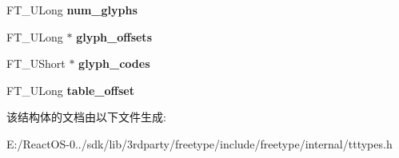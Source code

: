 \begin{DoxyCompactItemize}
F\+T\+\_\+\+U\+Long {\bfseries num\+\_\+glyphs}
\item 
\mbox{\label{struct_t_t___s_bit___range_rec___a475f649f101b5886cc2443934e6aa9ca}} 
F\+T\+\_\+\+U\+Long $\ast$ {\bfseries glyph\+\_\+offsets}
\item 
\mbox{\label{struct_t_t___s_bit___range_rec___ad40d4aa7e48bdb4ab8c98850f1bba178}} 
F\+T\+\_\+\+U\+Short $\ast$ {\bfseries glyph\+\_\+codes}
\item 
\mbox{\label{struct_t_t___s_bit___range_rec___a54457937305b5ccf895f5b23c0cc6006}} 
F\+T\+\_\+\+U\+Long {\bfseries table\+\_\+offset}
\end{DoxyCompactItemize}


该结构体的文档由以下文件生成\+:\begin{DoxyCompactItemize}
\item 
E\+:/\+React\+O\+S-\/0../sdk/lib/3rdparty/freetype/include/freetype/internal/tttypes.\+h\end{DoxyCompactItemize}
